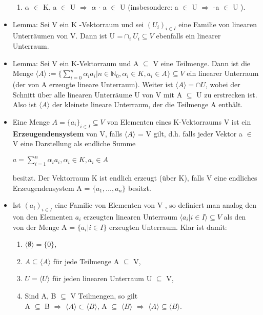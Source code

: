 \begin{itemize}
\begin{enumerate}
\item $\alpha$ $\in$ K, a $\in$ U $\Rightarrow$ $\alpha$ $\cdot$ a $\in$ U (insbesondere: a $\in$ U $\Rightarrow$ -a $\in$ U ).
\end{enumerate}
\item Lemma: Sei V ein K -Vektorraum und sei $(U_i )_{i \in I}$ eine Familie von linearen Unterräumen von V. Dann ist U =$\cap_i U_i \subseteq V$ ebenfalls ein linearer Unterraum.
\item Lemma: Sei V ein K-Vektorraum und A $\subseteq$ V eine Teilmenge. Dann ist die Menge $\langle A \rangle := \big\{ \sum\nolimits_{i=0}^{n} \alpha_i a_i | n \in \mathbb{N}_0, \alpha_i \in K, a_i \in A \big\} \subseteq V$ ein linearer Unterraum (der von A erzeugte lineare Unterraum). Weiter ist $\langle A \rangle = \cap U$, wobei der Schnitt über alle linearen Unterräume U von V mit A $\subseteq$ U zu erstrecken ist. Also ist $\langle A \rangle$ der kleinste lineare Unterraum, der die Teilmenge A enthält.
\item Eine Menge $A = \{a_i\}_{i \in I} \subseteq V$ von Elementen eines K-Vektorraums V ist ein \textbf{Erzeugendensystem} von V, falls $\langle A \rangle$ = V gilt, d.h. falls jeder Vektor a $\in$ V eine Darstellung als endliche Summe
\begin{center}
$a = \sum\nolimits_{i=1}^{n}\alpha_i a_i, \alpha_i \in K, a_i \in A$
\end{center}
besitzt. Der Vektorraum K ist endlich erzeugt (über K), falls V eine endliches Erzeugendensystem A = $\{a_1, …, a_n\}$ besitzt.
\item
\begin{remark} 
Ist $(a_i)_{i \in I}$ eine Familie von Elementen von V , so definiert man analog den von den Elementen $a_i$ erzeugten linearen Unterraum $\langle a_i | i \in I \rangle \subseteq V$ als den von der Menge A = $\{a_i | i \in I\}$ erzeugten Unterraum. Klar ist 
damit:
\begin{enumerate}
\item $\langle \emptyset \rangle = \{0\}$,
\item $A \subseteq \langle A \rangle$ für jede Teilmenge A $\subseteq$ V, 
\item $U = \langle U \rangle$ für jeden linearen Unterraum U $\subseteq$ V, 
\item Sind A, B $\subseteq$ V Teilmengen, so gilt\\ 
A $\subseteq$ B $\Rightarrow$ $\langle A \rangle \subset \langle B \rangle$, \hspace*{3mm}
A $\subseteq$ $\langle B \rangle$ $\Rightarrow$ $\langle A \rangle \subseteq \langle B \rangle$.

\end{enumerate}
\end{remark}
\end{itemize}
